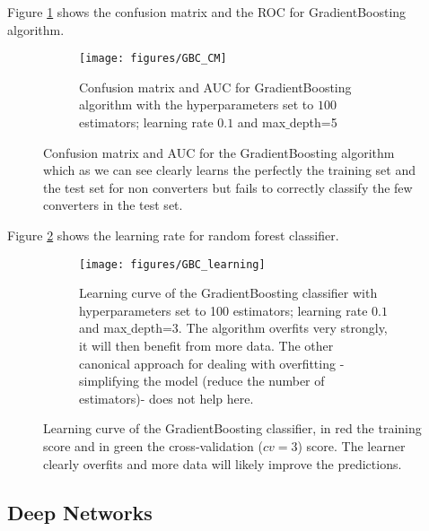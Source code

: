 \documentclass[11pt]{article}
\theoremstyle{definition}
\theoremstyle{remark}
\begin{document}
Figure \ref{fig:rf_gbc} shows the confusion matrix and the ROC for GradientBoosting algorithm. 
\begin{figure}[H]
    \centering
    \begin{subfigure}[t]{.8\textwidth}
        \centering
        \texttt{[image: figures/GBC\_CM]}
        \caption{Confusion matrix and AUC for GradientBoosting algorithm with the hyperparameters set to $100$ estimators; learning rate $0.1$ and max$\_$depth=5}
    \end{subfigure}
    \caption{Confusion matrix and AUC for the GradientBoosting algorithm which as we can see clearly learns the perfectly the training set and the test set for non converters but fails to correctly classify the few converters in the test set. } \label{fig:rf_gbc}
\end{figure}

Figure \ref{fig:gbc_learning} shows the learning rate for random forest classifier. 
\begin{figure}[H]
    \centering
    \begin{subfigure}[t]{.8\textwidth}
        \centering
        \texttt{[image: figures/GBC\_learning]}
        \caption{Learning curve of the GradientBoosting classifier with  hyperparameters set to 100 estimators; learning rate $0.1$ and max$\_$depth=3. The algorithm overfits very strongly, it will then benefit from more data. The other canonical approach for dealing with overfitting -simplifying the model (reduce the number of estimators)- does not help here.}
    \end{subfigure}
    \caption{Learning curve of the GradientBoosting classifier, in red the training score and in green the cross-validation ($cv=3$) score. The learner clearly overfits and more data will likely improve the predictions.} \label{fig:gbc_learning}
\end{figure}


\subsection{Deep Networks}
\label{sse:resdeep}
\end{document}
